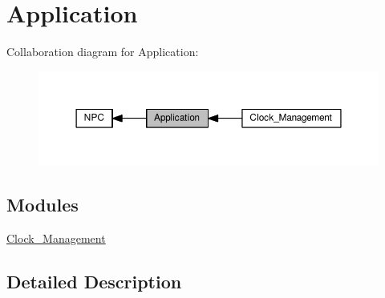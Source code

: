 \hypertarget{group___application}{}\section{Application}
\label{group___application}
Collaboration diagram for Application\+:\nopagebreak
\begin{figure}[H]
\begin{center}
\leavevmode
\includegraphics[width=350pt]{df/d29/group___application}
\end{center}
\end{figure}
\subsection*{Modules}
\begin{DoxyCompactItemize}
\item 
\hyperlink{group___clock___management}{Clock\+\_\+\+Management}
\end{DoxyCompactItemize}


\subsection{Detailed Description}

